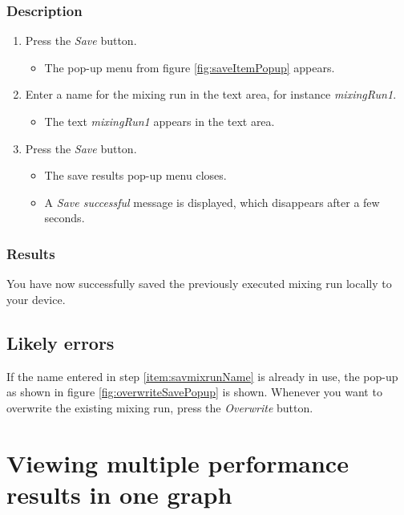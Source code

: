 \subsubsection{Description}
\begin{enumerate}
	\item Press the \emph{Save} button.
		\begin{itemize}
			\item The pop-up menu from figure \ref{fig:saveItemPopup} appears.
		\end{itemize}
	\item Enter a name for the mixing run in the text area, for instance \emph{mixingRun1}.
		\begin{itemize}
			\item The text \emph{mixingRun1} appears in the text area.
		\end{itemize}
	\item Press the \emph{Save} button. \label{item:savmixrunName}
		\begin{itemize}
			\item The save results pop-up menu closes.
			\item A \emph{Save successful} message is displayed, which disappears after a few seconds.
		\end{itemize}
\end{enumerate}

\subsubsection{Results}
You have now successfully saved the previously executed mixing run locally to your device.

\subsection{Likely errors}
If the name entered in step \ref{item:savmixrunName} is already in use, the pop-up as shown in figure \ref{fig:overwriteSavePopup} is shown. Whenever you want to overwrite the existing mixing run, press the \emph{Overwrite} button.


\section{Viewing multiple performance results in one graph}\label{sec:viewmultgraph}

